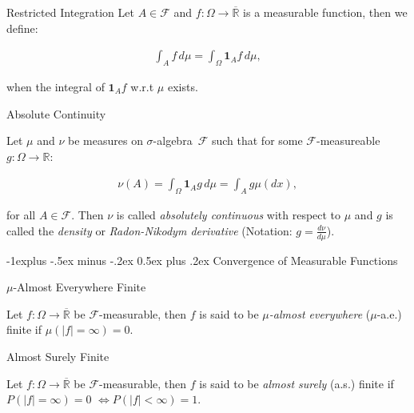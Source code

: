 \documentclass[10pt,landscape]{article}
\makeatletter
\newcommand{\SigmaAlgebra}{$\sigma$-algebra}
\newcommand{\Indicator}[1]{\mathbf{1}_{#1}}
\newcommand{\CalF}{\mathcal{F}}
\renewcommand{\subsection}{\@startsection{subsection}{2}{0mm}%
                                {-1explus -.5ex minus -.2ex}%
                                {0.5ex plus .2ex}%
                                {\normalfont\normalsize\bfseries}}
\makeatother
\begin{document}
\begin{multicols}{3}
\begin{definition}{}{Restricted Integration}
    Let $A \in \CalF$ and $f: \Omega \to \overline{\mathbb{R}}$ is a measurable function, then we define:

        \begin{align*}
            \int_A f \, d\mu = \int_{\Omega} \Indicator{A} f \, d\mu,
        \end{align*}

    when the integral of $\Indicator{A} f$ w.r.t $\mu$ exists.

\end{definition}

\begin{definition}{3.7}{Absolute Continuity}

    Let $\mu$ and $\nu$ be measures on \SigmaAlgebra\ $\CalF$ such that for some $\CalF$-measureable $g: \Omega \to \mathbb{R}$:

        \begin{align*}
            \nu(A) = \int_{\Omega} \Indicator{A} g \, d\mu = \int_{A} g \mu(dx),
        \end{align*}

    for all $A \in \CalF$. Then $\nu$ is called \emph{absolutely continuous} with respect to $\mu$ and $g$ is called the \emph{density} or \emph{Radon-Nikodym derivative} (Notation: $g = \frac{d\nu}{d\mu}$).

\end{definition}

\subsection{Convergence of Measurable Functions}

\begin{definition}{}{$\mu$-Almost Everywhere Finite}

    Let $f: \Omega \to \overline{\mathbb{R}}$ be $\CalF$-measurable, then $f$ is said to be \emph{$\mu$-almost everywhere} ($\mu$-a.e.) finite if $\mu(|f| = \infty) = 0$.

\end{definition}

\begin{definition}{}{Almost Surely Finite}

    Let $f: \Omega \to \overline{\mathbb{R}}$ be $\CalF$-measurable, then $f$ is said to be \emph{almost surely} (a.s.) finite if $P(|f| = \infty) = 0$ $\Leftrightarrow P(|f| < \infty) = 1$.

\end{definition}


\end{multicols}
\end{document}
